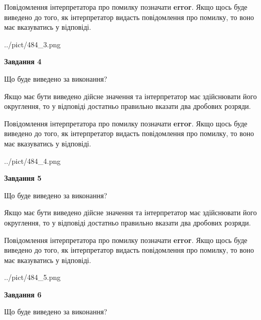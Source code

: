 \documentclass[12pt, ukrainian]{article}
\begin{document}
{\begin {Large}
Повідомлення інтерпретатора про помилку позначати \textbf{error}.
Якщо щось буде виведено до того, як інтерпретатор видасть повідомлення про помилку, 
то воно має вказуватись у відповіді. \par

\begin{center}
	{../pict/484_3.png}
\end{center}
\newpage

{\begin {center}\textbf{Завдання 4}\end {center}}\par
Що буде виведено за виконання? \par

Якщо має бути виведено дійсне значення та інтерпретатор має здійснювати його округлення, 
то у відповіді достатньо правильно вказати два дробових розряди.

Повідомлення інтерпретатора про помилку позначати \textbf{error}.
Якщо щось буде виведено до того, як інтерпретатор видасть повідомлення про помилку, 
то воно має вказуватись у відповіді. \par

\begin{center}
	{../pict/484_4.png}
\end{center}
\newpage

{\begin {center}\textbf{Завдання 5}\end {center}}\par
Що буде виведено за виконання? \par

Якщо має бути виведено дійсне значення та інтерпретатор має здійснювати його округлення, 
то у відповіді достатньо правильно вказати два дробових розряди.

Повідомлення інтерпретатора про помилку позначати \textbf{error}.
Якщо щось буде виведено до того, як інтерпретатор видасть повідомлення про помилку, 
то воно має вказуватись у відповіді. \par

\begin{center}
	{../pict/484_5.png}
\end{center}
\newpage

{\begin {center}\textbf{Завдання 6}\end {center}}\par
Що буде виведено за виконання? \par


\end{Large}}
\end{document}
